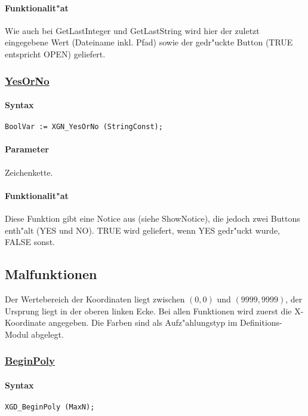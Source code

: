 \paragraph{Funktionalit"at}
Wie auch bei GetLastInteger und GetLastString wird hier der zuletzt eingegebene
Wert (Dateiname inkl. Pfad) sowie der gedr"uckte Button (TRUE entspricht OPEN)
geliefert.

\subsubsection{\underline{YesOrNo}}

\paragraph{Syntax}
\begin{verbatim}
BoolVar := XGN_YesOrNo (StringConst);
\end{verbatim}

\paragraph{Parameter}
Zeichenkette.

\paragraph{Funktionalit"at}
Diese Funktion gibt eine Notice aus (siehe ShowNotice), die jedoch zwei Buttons
enth"alt (YES und NO). TRUE wird geliefert, wenn YES gedr"uckt wurde, FALSE sonst.

\subsection{Malfunktionen\label{XGD}}
%
%
Der Wertebereich der Koordinaten liegt zwischen $(0, 0)$ und $(9999, 9999)$,
der Ursprung liegt in der oberen linken Ecke. Bei allen Funktionen wird zuerst
die X-Koordinate angegeben. Die Farben sind als Aufz"ahlungstyp im Definitions-
Modul abgelegt.

\subsubsection{\underline{BeginPoly}}

\paragraph{Syntax}
\begin{verbatim}
XGD_BeginPoly (MaxN);
\end{verbatim}

